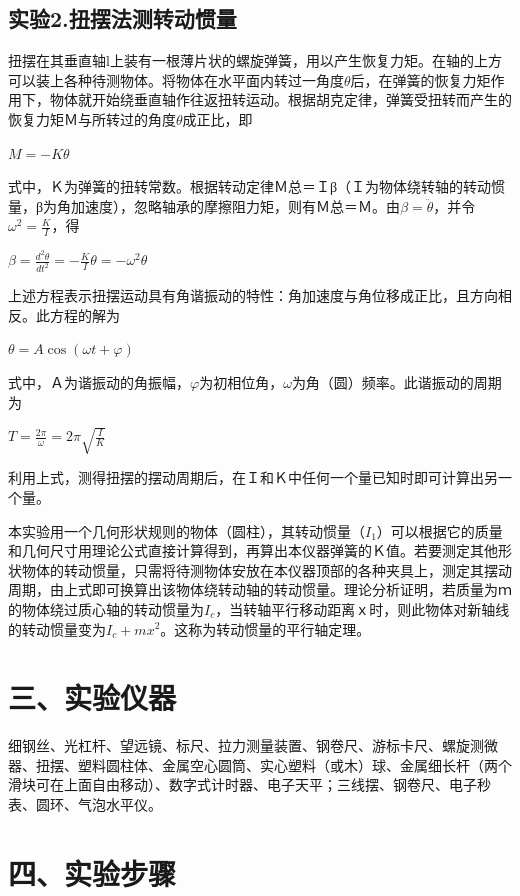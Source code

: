 \documentclass[11pt,a4paper,oneside]{article}
\begin{document}
\subsection*{实验2.扭摆法测转动惯量}
扭摆在其垂直轴l上装有一根薄片状的螺旋弹簧，用以产生恢复力矩。在轴的上方可以装上各种待测物体。将物体在水平面内转过一角度$\theta$后，在弹簧的恢复力矩作用下，物体就开始绕垂直轴作往返扭转运动。根据胡克定律，弹簧受扭转而产生的恢复力矩Ｍ与所转过的角度$\theta$成正比，即
\begin{center}
$M=-K\theta$
\end{center}
式中，Ｋ为弹簧的扭转常数。根据转动定律Ｍ总＝Ｉβ（Ｉ为物体绕转轴的转动惯量，β为角加速度），忽略轴承的摩擦阻力矩，则有Ｍ总＝Ｍ。由$\beta = \ddot{\theta}$，并令$\omega ^2=\displaystyle\frac{K}{I}$，得
\begin{center}
$\beta =\displaystyle\frac{d^2\theta}{dt^2}=-\displaystyle\frac{K}{I}\theta=-\omega ^2\theta $
\end{center}
上述方程表示扭摆运动具有角谐振动的特性：角加速度与角位移成正比，且方向相反。此方程的解为
\begin{center}
$\theta =A\cos (\omega t+\varphi )$
\end{center}
式中，Ａ为谐振动的角振幅，$\varphi$为初相位角，$\omega$为角（圆）频率。此谐振动的周期为
\begin{center}
$ T=\displaystyle\frac{2\pi }{\omega}=2\pi \sqrt{\displaystyle\frac{I}{K}}$
\end{center}
利用上式，测得扭摆的摆动周期后，在Ｉ和Ｋ中任何一个量已知时即可计算出另一个量。

本实验用一个几何形状规则的物体（圆柱），其转动惯量（$I_1$）可以根据它的质量和几何尺寸用理论公式直接计算得到，再算出本仪器弹簧的Ｋ值。若要测定其他形状物体的转动惯量，只需将待测物体安放在本仪器顶部的各种夹具上，测定其摆动周期，由上式即可换算出该物体绕转动轴的转动惯量。理论分析证明，若质量为ｍ的物体绕过质心轴的转动惯量为$I_c$，当转轴平行移动距离ｘ时，则此物体对新轴线的转动惯量变为$I_c+mx^2$。这称为转动惯量的平行轴定理。




\section*{三、实验仪器}
细钢丝、光杠杆、望远镜、标尺、拉力测量装置、钢卷尺、游标卡尺、螺旋测微器、扭摆、塑料圆柱体、金属空心圆筒、实心塑料（或木）球、金属细长杆（两个滑块可在上面自由移动）、数字式计时器、电子天平；三线摆、钢卷尺、电子秒表、圆环、气泡水平仪。

\section*{四、实验步骤}
\end{document}
